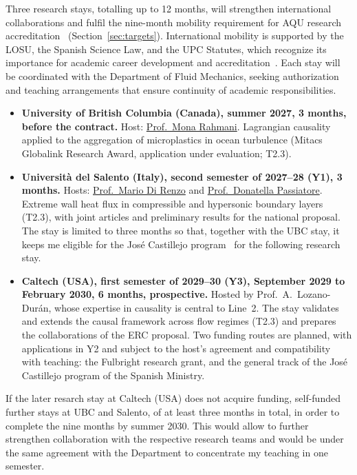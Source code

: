 \documentclass[11pt]{article}
\begin{document}
Three research stays, totalling up to 12 months, will strengthen international collaborations and fulfil the nine-month mobility requirement for AQU research accreditation~\cite{AQU2025} (Section~\ref{sec:targets}).
International mobility is supported by the LOSU, the Spanish Science Law, and the UPC Statutes, which recognize its importance for academic career development and accreditation~\cite{LOSU2023,LCTI2011,UPCStatutes2025}.
Each stay will be coordinated with the Department of Fluid Mechanics, seeking authorization and teaching arrangements that ensure continuity of academic responsibilities.
\begin{itemize}
  \item \textbf{University of British Columbia (Canada), summer 2027, 3 months, before the
  contract.} Host: \href{https://chbe.ubc.ca/mona-rahmani/}{Prof.\ Mona Rahmani}. Lagrangian
  causality applied to the aggregation of microplastics in ocean turbulence (Mitacs Globalink
  Research Award, application under evaluation; T2.3).
  
  \item \textbf{Universit\`a del Salento (Italy), second semester of 2027--28 (Y1), 3 months.} Hosts: \href{https://www.unisalento.it/scheda-utente/-/people/mario.direnzo}{Prof.\ Mario Di Renzo} and \href{https://www.unisalento.it/scheda-utente/-/people/donatella.passiatore}{Prof.\ Donatella Passiatore}. Extreme wall heat flux in compressible and hypersonic boundary layers (T2.3), with joint articles and preliminary results for the national proposal. The stay is limited to three months so that, together with the UBC stay, it keeps me eligible for the José Castillejo program~\cite{Castillejo2026} for the following research stay.
  
  \item \textbf{Caltech (USA), first semester of 2029--30 (Y3), September 2029 to February 2030, 6 months,
  prospective.} Hosted by Prof.\ A.\ Lozano-Dur\'an, whose expertise in causality is central to Line~2. The stay validates and extends the causal framework across flow regimes (T2.3) and prepares the collaborations of the ERC proposal. Two funding routes are planned, with applications in Y2 and subject to the host's agreement and compatibility with teaching: the Fulbright research grant, and the general track of the José Castillejo program of the Spanish Ministry.
\end{itemize}
If the later resarch stay at Caltech (USA) does not acquire funding, self-funded further stays at UBC and Salento, of at least three months in total, in order to complete the nine months by summer 2030. This would allow to further strengthen collaboration with the respective research teams and would be under the same agreement with the Department to concentrate my teaching in one semester.
\end{document}
